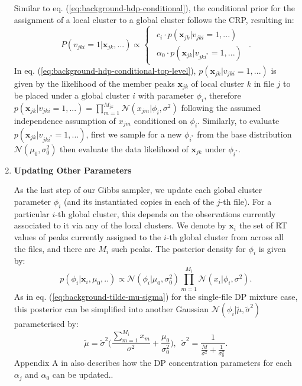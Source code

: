 \begin{enumerate}
Similar to eq. (\ref{eq:background-hdp-conditional}), the conditional prior for the assignment of a local cluster to a global cluster follows the CRP, resulting in:
\begin{dmath}
P(v_{jki}=1 \vert \boldsymbol{x}_{jk}, ...)\propto\begin{cases}
\begin{array}{c}
c_{i}\cdot p(\boldsymbol{x}_{jk} \vert v_{jki}=1,...)\\
\alpha_{0}\cdot p(\boldsymbol{x}_{jk} \vert v_{jki^{*}}=1,...)
\end{array}\end{cases}.\label{eq:background-hdp-conditional-top-level}
\end{dmath}
In eq. (\ref{eq:background-hdp-conditional-top-level}), $p(\boldsymbol{x}_{jk} \vert v_{jki}=1,...)$ is given by the likelihood of the member peaks $\boldsymbol{x}_{jk}$ of local cluster $k$ in file $j$ to be placed under a global cluster $i$ with parameter $\phi_{i}$, therefore $p(\boldsymbol{x}_{jk} \vert v_{jki}=1,...) = \prod_{m=1}^{M_{jk}} \mathcal{N}(x_{jm} \vert \phi_{i}, \sigma^2)$ following the assumed independence assumption of $x_{jm}$ conditioned on $\phi_{i}$. Similarly, to evaluate $p(\boldsymbol{x}_{jk} \vert v_{jki^{*}}=1,...)$, first we sample for a new $\phi_{i^{*}}$ from the base distribution $\mathcal{N}(\mu_0, \sigma_0^2)$ then evaluate the data likelihood of $\boldsymbol{x}_{jk}$ under $\phi_{i^{*}}$. 

\item \textbf{Updating Other Parameters}

As the last step of our Gibbs sampler, we update each global cluster parameter $\phi_i$ (and its instantiated copies in each of the $j$-th file). For a particular $i$-th global cluster, this depends on the observations currently associated to it via any of the local clusters. We denote by $\boldsymbol{x}_{i}$ the set of RT values of peaks currently assigned to the $i$-th global cluster from across all the files, and there are $M_i$ such peaks. The posterior density for $\phi_i$ is given by:
\begin{equation}
p(\phi_i \vert \boldsymbol{x}_i, \mu_0, ..) \propto \mathcal{N}(\phi_i \vert \mu_0, \sigma_0^2) \prod_{m=1}^{M_i} \mathcal{N}(x_i \vert \phi_i, \sigma^2).
\label{eq:background-tilde-hdp-parameters-update}
\end{equation}
As in eq. (\ref{eq:background-tilde-mu-sigma}) for the single-file DP mixture case, this posterior can be simplified into another Gaussian $\mathcal{N}(\phi_i \vert \tilde{\mu}, \tilde{\sigma}^2)$ parameterised by:
\begin{equation}
\tilde{\mu} = \tilde{\sigma}^2 \bigg( \frac{\sum_{m=1}^{M_i} x_m}{\sigma^2} + \frac{\mu_0}{\sigma_0^2} \bigg), \enspace
\tilde{\sigma}^2 = \frac{1}{\frac{M}{\sigma^2} + \frac{1}{\sigma^2_0}}.
\label{eq:background-tilde-hdp-posterior}
\end{equation}
Appendix A in \cite{teh2012hierarchical} also describes how the DP concentration parameters for each $\alpha_j$ and $\alpha_0$ can be updated..

\end{enumerate}

